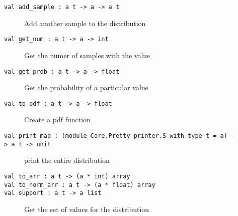 \begin{description}
\item[{\protect\hyperlink{val-addux5fsample}{}\texttt{val\ add\_sample\ :\ \textquotesingle{}a\ t\ -\textgreater{}\ \textquotesingle{}a\ -\textgreater{}\ \textquotesingle{}a\ t}}]
Add another sample to the distribution
\end{description}

\begin{description}
\item[{\protect\hyperlink{val-getux5fnum}{}\texttt{val\ get\_num\ :\ \textquotesingle{}a\ t\ -\textgreater{}\ \textquotesingle{}a\ -\textgreater{}\ int}}]
Get the numer of samples with the value
\end{description}

\begin{description}
\item[{\protect\hyperlink{val-getux5fprob}{}\texttt{val\ get\_prob\ :\ \textquotesingle{}a\ t\ -\textgreater{}\ \textquotesingle{}a\ -\textgreater{}\ float}}]
Get the probability of a particular value
\end{description}

\begin{description}
\item[{\protect\hyperlink{val-toux5fpdf}{}\texttt{val\ to\_pdf\ :\ \textquotesingle{}a\ t\ -\textgreater{}\ \textquotesingle{}a\ -\textgreater{}\ float}}]
Create a pdf function
\end{description}

\begin{description}
\item[{\protect\hyperlink{val-printux5fmap}{}\texttt{val\ print\_map\ :\ (module\ Core.Pretty\_printer.S\ with\ type\ t\ =\ \textquotesingle{}a)\ -\textgreater{}\ \textquotesingle{}a\ t\ -\textgreater{}\ unit}}]
print the entire distribution
\end{description}

\begin{description}
\item[{\protect\hyperlink{val-toux5farr}{}\texttt{val\ to\_arr\ :\ \textquotesingle{}a\ t\ -\textgreater{}\ (\textquotesingle{}a\ *\ int)\ array}\\
\protect\hyperlink{val-toux5fnormux5farr}{}\texttt{val\ to\_norm\_arr\ :\ \textquotesingle{}a\ t\ -\textgreater{}\ (\textquotesingle{}a\ *\ float)\ array}\\
\protect\hyperlink{val-support}{}\texttt{val\ support\ :\ \textquotesingle{}a\ t\ -\textgreater{}\ \textquotesingle{}a\ list}}]
Get the set of values for the distribution
\end{description}

